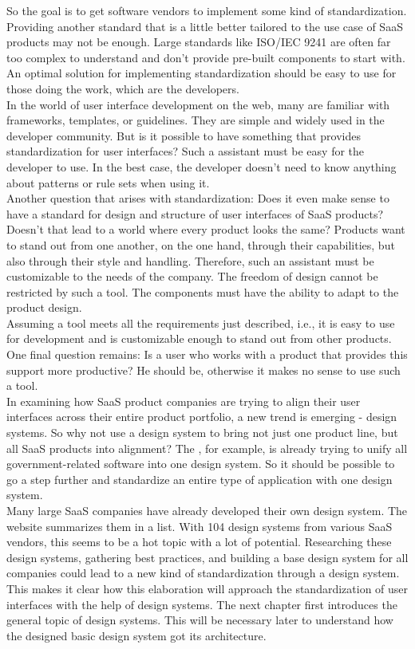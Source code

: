 So the goal is to get software vendors to implement some kind of standardization. Providing another standard that is a little better tailored to the use case of SaaS products may not be enough. Large standards like ISO/IEC 9241 are often far too complex to understand and don't provide pre-built components to start with. An optimal solution for implementing standardization should be easy to use for those doing the work, which are the developers. \\
In the world of user interface development on the web, many are familiar with frameworks, templates, or guidelines. They are simple and widely used in the developer community. But is it possible to have something that provides standardization for user interfaces? Such a assistant must be easy for the developer to use. In the best case, the developer doesn't need to know anything about patterns or rule sets when using it. \\
Another question that arises with standardization: Does it even make sense to have a standard for design and structure of user interfaces of SaaS products? Doesn't that lead to a world where every product looks the same? Products want to stand out from one another, on the one hand, through their capabilities, but also through their style and handling. Therefore, such an assistant must be customizable to the needs of the company. The freedom of design cannot be restricted by such a tool. The components must have the ability to adapt to the product design. \\
Assuming a tool meets all the requirements just described, i.e., it is easy to use for development and is customizable enough to stand out from other products. One final question remains: Is a user who works with a product that provides this support more productive? He should be, otherwise it makes no sense to use such a tool. \\

In examining how SaaS product companies are trying to align their user interfaces across their entire product portfolio, a new trend is emerging - design systems. So why not use a design system to bring not just one product line, but all SaaS products into alignment? The , for example, is already trying to unify all government-related software into one design system. So it should be possible to go a step further and standardize an entire type of application with one design system. \\
Many large SaaS companies have already developed their own design system. The  website summarizes them in a list. With 104 design systems from various SaaS vendors, this seems to be a hot topic with a lot of potential. Researching these design systems, gathering best practices, and building a base design system for all companies could lead to a new kind of standardization through a design system. \\

This makes it clear how this elaboration will approach the standardization of user interfaces with the help of design systems. The next chapter first introduces the general topic of design systems. This will be necessary later to understand how the designed basic design system got its architecture.